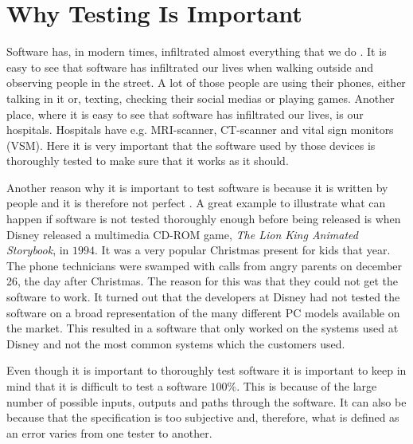 \documentclass[../../master.tex]{subfiles}
\begin{document}
\section{Why Testing Is Important} \label{sec:whytesting}
Software has, in modern times, infiltrated almost everything that we do \cite{SoftwareTesting}.
It is easy to see that software has infiltrated our lives when walking outside and observing people in the street.
A lot of those people are using their phones, either talking in it or, texting, checking their social medias or playing games.
Another place, where it is easy to see that software has infiltrated our lives, is our hospitals.
Hospitals have e.g. MRI-scanner, CT-scanner and vital sign monitors (VSM).
Here it is very important that the software used by those devices is thoroughly tested to make sure that it works as it should.

Another reason why it is important to test software is because it is written by people and it is therefore not perfect \cite{SoftwareTesting}.
A great example to illustrate what can happen if software is not tested thoroughly enough before being released is when Disney released a multimedia CD-ROM game, \textit{The Lion King Animated Storybook}, in $1994$.
It was a very popular Christmas present for kids that year.
The phone technicians were swamped with calls from angry parents on december 26, the day after Christmas.
The reason for this was that they could not get the software to work.
It turned out that the developers at Disney had not tested the software on a broad representation of the many different PC models available on the market.
This resulted in a software that only worked on the systems used at Disney and not the most common systems which the customers used. \cite{SoftwareTesting}

Even though it is important to thoroughly test software it is important to keep in mind that it is difficult to test a software $100\%$.
This is because of the large number of possible inputs, outputs and paths through the software.
It can also be because that the specification is too subjective and, therefore, what is defined as an error varies from one tester to another. \cite{SoftwareTesting}
\end{document}
